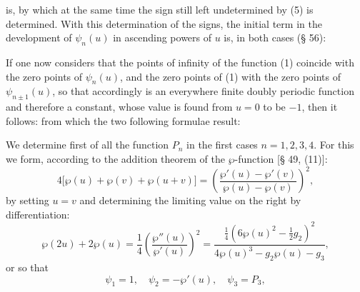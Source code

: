 
is, by which at the same time the sign still left undetermined by (5) is
determined. With this determination of the signs, the initial term in the
development of $\psi_n(u)$ in ascending powers of $u$ is, in both cases
(§ 56):

If one now considers that the points of infinity of the function (1) coincide
with the zero points of $\psi_n(u)$, and the zero points of (1) with the zero
points of $\psi_{n\pm1}(u)$, so that accordingly
is an everywhere finite doubly periodic function and therefore a constant,
whose value is found from $u=0$ to be $-1$, then it follows:
from which the two following formulae result:

We determine first of all the function $P_n$ in the first cases $n=1, 2, 3,
4$. For this we form, according to the addition theorem of the $\wp$-function
[§ 49, (11)]:
\[
4\big[\wp(u) + \wp(v) + \wp(u+v)\big] = \left(\frac{\wp'(u)-\wp'(v)}{\wp(u)-\wp(v)}\right)^2,
\]
by setting $u=v$ and determining the limiting value on the right by
differentiation:
\[
\wp(2u) + 2\wp(u) = \frac14\left(\frac{\wp''(u)}{\wp'(u)}\right)^2
= \frac{\frac14\left(6\wp(u)^2 - \frac12 g_2\right)^2}{4\wp(u)^3 - g_2\wp(u) - g_3},
\]
or
so that
\[
\psi_1 = 1,\quad \psi_2 = -\wp'(u),\quad \psi_3 = P_3,
\]
